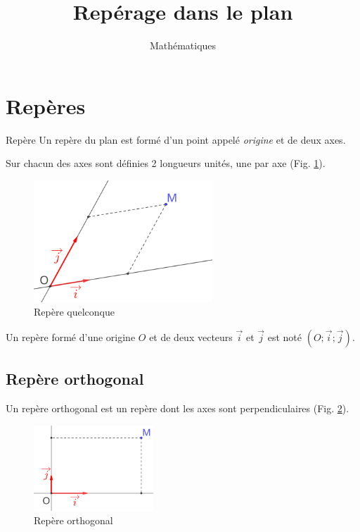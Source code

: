\documentclass[a4paper,12pt]{scrartcl}
\date{}
\title{Repérage dans le plan}
\author{Mathématiques}
\begin{document}
\maketitle


\section{Repères}

\begin{definition}{Repère}
Un repère du plan est formé d'un point appelé \emph{origine} et de deux axes.

Sur chacun des axes sont définies 2 longueurs unités, une par axe (Fig. \ref{RepQuelconque}).
\end{definition}

\begin{figure}[h]
\begin{center}
\includegraphics[width=0.6\textwidth]{pics/RepereQuelconque.png}
\end{center}
\caption{Repère quelconque}
\label{RepQuelconque}
\end{figure}

Un repère formé d'une origine $O$ et de deux vecteurs $\overrightarrow{i}$ et $\overrightarrow{j}$ est noté $\left (O;\overrightarrow{i};\overrightarrow{j}\right )$.

\subsection{Repère orthogonal}

Un repère orthogonal est un repère dont les axes sont perpendiculaires (Fig. \ref{RepOrthogonal}).

\begin{figure}[h]
\begin{center}
\includegraphics[width=0.4\textwidth]{pics/RepereOrthogonal.png}
\end{center}
\caption{Repère orthogonal}
\label{RepOrthogonal}
\end{figure}
\end{document}
